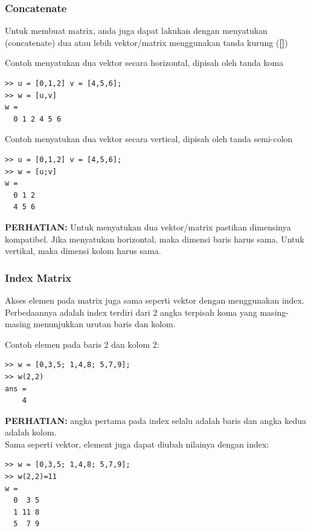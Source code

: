 \documentclass[12pt]{book}
\begin{document}
	\subsubsection{Concatenate}

	Untuk membuat matrix, anda juga dapat lakukan dengan menyatukan (concatenate) dua atau lebih vektor/matrix menggunakan tanda kurung (\textbf{[]})

	Contoh menyatukan dua vektor secara horizontal, dipisah oleh tanda koma
	\begin{verbatim}
>> u = [0,1,2] v = [4,5,6];
>> w = [u,v]
w =
  0 1 2 4 5 6
	\end{verbatim}

	Contoh menyatukan dua vektor secara vertical, dipisah oleh tanda semi-colon
	\begin{verbatim}
>> u = [0,1,2] v = [4,5,6];
>> w = [u;v]
w =
  0 1 2
  4 5 6
	\end{verbatim}

	\textbf{PERHATIAN:} Untuk menyatukan dua vektor/matrix pastikan dimensinya kompatibel.
	Jika menyatukan horizontal, maka dimensi baris harus sama.
	Untuk vertikal, maka dimensi kolom harus sama.
	\subsubsection{Index Matrix}

	Akses elemen pada matrix juga sama seperti vektor dengan menggunakan index.
	Perbedaannya adalah index terdiri dari 2 angka terpisah koma yang masing-masing menunjukkan urutan baris dan kolom.

	Contoh elemen pada baris 2 dan kolom 2:
	\begin{verbatim}
>> w = [0,3,5; 1,4,8; 5,7,9];
>> w(2,2)
ans =
    4
	\end{verbatim}

	\textbf{PERHATIAN:} angka pertama pada index selalu adalah baris dan angka kedua adalah kolom.\\

	Sama seperti vektor, element juga dapat diubah nilainya dengan index:
	\begin{verbatim}
>> w = [0,3,5; 1,4,8; 5,7,9];
>> w(2,2)=11
w =
  0  3 5
  1 11 8
  5  7 9
	\end{verbatim}
\end{document}
